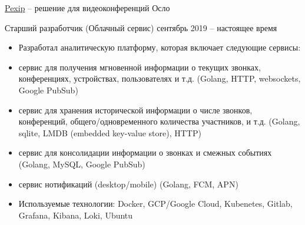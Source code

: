\documentclass[unicode, 10pt, a4paper, oneside, fleqn]{article}
\begin{document}
\job  %
    {\href{http://www.pexip.com}{Pexip} -- решение для видеоконференций}
    {Осло}
    {
        \position  %
        {Старший разработчик (Облачный сервис)}
        {сентябрь 2019 -- настоящее время}
        {
            \begin{itemize}
                \item{Разработал аналитическую платформу, которая включает
                    следующие сервисы:}
                \item{сервис для получения мгновенной информации о текущих
                    звонках, конференциях, устройствах, пользователях и т.д.
                    (Golang, HTTP, websockets, Google PubSub)}
                \item{сервис для хранения исторической информации о числе звонков,
                    конференций, общего/одновременного количества участников, и
                    т.д. (Golang, sqlite, LMDB (embedded key-value store), HTTP)}
                \item{сервис для консолидации информации о звонках и смежных
                    событиях (Golang, MySQL, Google PubSub)}
                \item{сервис нотификаций (desktop/mobile) (Golang, FCM, APN)}
                \item{Используемые технологии: Docker, GCP/Google Cloud, Kubenetes,
                    Gitlab, Grafana, Kibana, Loki, Ubuntu}
            \end{itemize}
        }
    }
\end{document}
